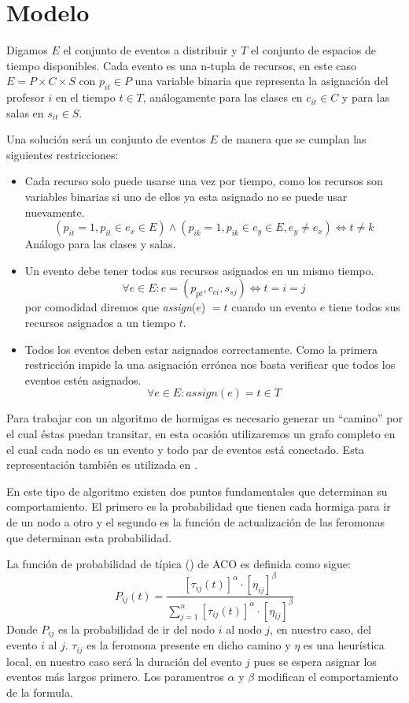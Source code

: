 \documentclass[letter, 10pt]{article}
\renewcommand{\it}[1]{\textit{#1}}
\begin{document}
\section{Modelo}\label{sec:mod}
Digamos $E$ el conjunto de eventos a distribuir y $T$ el conjunto de espacios de
tiempo disponibles. Cada evento es una n-tupla de recursos, en este caso $E = P
\times C \times S$ con $p_{it} \in P$ una variable binaria que representa la
asignación del profesor $i$ en el tiempo $t \in T$, análogamente para las clases
en $c_{it} \in C$ y para las salas en $s_{it} \in S$.

Una solución será un conjunto de eventos $E$ de manera que se cumplan las
siguientes restricciones:
\begin{itemize}
  \item
    Cada recurso solo puede usarse una vez por tiempo, como los recursos son
    variables binarias si uno de ellos ya esta asignado no se puede usar
    nuevamente.
    $$ (p_{it}=1, p_{it}\in e_x \in E) \land (p_{ik}=1, p_{ik}\in e_y \in E,
    e_y \neq e_x) \iff t \neq k $$
    Análogo para las clases y salas.
  \item
    Un evento debe tener todos sus recursos asignados en un mismo tiempo.
    $$ \forall e \in E : e = (p_{pt}, c_{ci}, s_{sj}) \iff t = i = j $$
    por comodidad diremos que \it{assign}($e$) $= t$ cuando un evento $e$ tiene
    todos sus recursos asignados a un tiempo $t$.
  \item
    Todos los eventos deben estar asignados correctamente. Como la primera
    restricción impide la una asignación errónea nos basta verificar que todos
    los eventos estén asignados.
    $$ \forall e \in E : \it{assign}(e) = t \in T$$
\end{itemize}

Para trabajar con un algoritmo de hormigas es necesario generar un ``camino''
por el cual éstas puedan transitar, en esta ocasión utilizaremos un grafo
completo en el cual cada nodo es un evento y todo par de eventos está conectado.
Esta representación también es utilizada en \cite{socha2002max}.

En este tipo de algoritmo existen dos puntos fundamentales que determinan su
comportamiento. El primero es la probabilidad que tienen cada hormiga para ir de
un nodo a otro y el segundo es la función de actualización de las feromonas que
determinan esta probabilidad.

La función de probabilidad de típica (\cite{colorni1991distributed}) de ACO es
definida como sigue:
\begin{equation} \label{eq:prob}
  P_{ij}(t) = \frac{ [\tau_{ij}(t)]^{\alpha}\cdot [\eta_{ij}]^{\beta} }
  { \sum_{j=1}^{n} [\tau_{ij}(t)]^{\alpha}\cdot [\eta_{ij}]^{\beta} }
\end{equation}
Donde $P_{ij}$ es la probabilidad de ir del nodo $i$ al nodo $j$, en nuestro
caso, del evento $i$ al $j$. $\tau_{ij}$ es la feromona presente en dicho camino
y $\eta$ es una heurística local, en nuestro caso será la duración del evento
$j$ pues se espera asignar los eventos más largos primero. Los paramentros
$\alpha$ y $\beta$ modifican el comportamiento de la formula.
\end{document}
